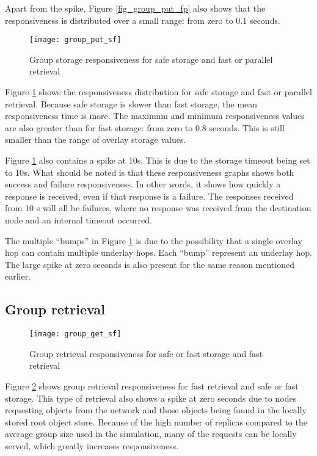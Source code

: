 Apart from the spike, Figure \ref{fig_group_put_fp} also shows that the responsiveness is distributed over a small range: from zero to 0.1 seconds.

\begin{figure}[htbp]
 \centering
 \texttt{[image: group\_put\_sf]}
 \caption{Group storage responsiveness for safe storage and fast or parallel retrieval}
 \label{fig_group_put_sf}
\end{figure}
%
Figure \ref{fig_group_put_sf} shows the responsiveness distribution for safe storage and fast or parallel retrieval. Because safe storage is slower than fast storage, the mean responsiveness time is more. The maximum and minimum responsiveness values are also greater than for fast storage: from zero to 0.8 seconds. This is still smaller than the range of overlay storage values.

Figure \ref{fig_group_put_sf} also contains a spike at 10s. This is due to the storage timeout being set to 10s. What should be noted is that these responsiveness graphs shows both success and failure responsiveness. In other words, it shows how quickly a response is received, even if that response is a failure. The responses received from 10 s will all be failures, where no response was received from the destination node and an internal timeout occurred.

The multiple ``bumps'' in Figure \ref{fig_group_put_sf} is due to the possibility that a single overlay hop can contain multiple underlay hops. Each ``bump'' represent an underlay hop. The large spike at zero seconds is also present for the same reason mentioned earlier.

\subsection{Group retrieval}

\begin{figure}[htbp]
 \centering
 \texttt{[image: group\_get\_sf]}
 \caption{Group retrieval responsiveness for safe or fast storage and fast retrieval}
 \label{fig_group_get_sf}
\end{figure}
%
Figure \ref{fig_group_get_sf} shows group retrieval responsiveness for fast retrieval and safe or fast storage. This type of retrieval also shows a spike at zero seconds due to nodes requesting objects from the network and those objects being found in the locally stored root object store. Because of the high number of replicas compared to the average group size used in the simulation, many of the requests can be locally served, which greatly increases responsiveness.

